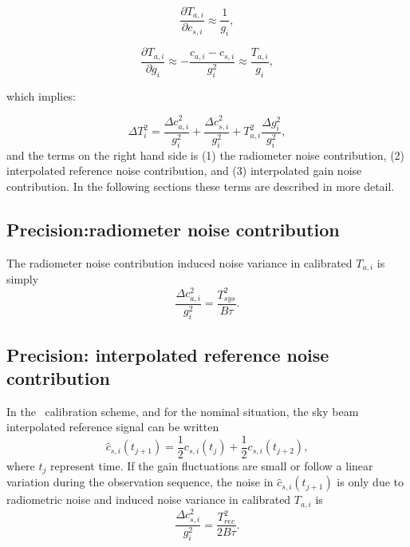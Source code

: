 \begin{equation}
\frac{\partial T_{a,i}}{\partial c_{s,i}} \approx \frac{1}{g_i}, 
\end{equation}

\begin{equation}
\frac{\partial T_{a,i}}{\partial g_{i}} \approx -\frac{c_{a,i}-c_{s,i}}{g_{i}^{2}} \approx \frac{T_{a,i}}{g_i}, 
\end{equation}

which implies:

\begin{equation}
\Delta T_{i}^{2} = \frac{\Delta c_{a,i}^{2}}{g_{i}^2} + \frac{\Delta c_{s,i}^{2}}{g_{i}^2} + T_{a,i}^{2}\frac{\Delta g_{i}^{2}}{g_{i}^2},
\end{equation}
and the terms on the right hand side is (1) the radiometer noise contribution,
(2) interpolated reference noise contribution, and (3) interpolated gain noise contribution.  
In the following sections these terms are described in more detail.

\subsection*{Precision:radiometer noise contribution}
The radiometer noise contribution induced noise variance in calibrated \(T_{a,i}\) is simply
\begin{equation}
\frac{\Delta c_{a,i}^{2}}{g_{i}^2} = \frac{T_{sys}^{2}}{B\tau}.
\end{equation}



\subsection*{Precision: interpolated reference noise contribution}
In the \smr\ calibration scheme, and for the nominal situation, the sky beam interpolated
reference signal can be written
\begin{equation}
\hat{c}_{s,i}(t_{j+1}) = \frac{1}{2}c_{s,i}(t_{j}) + \frac{1}{2}c_{s,i}(t_{j+2}), 
\end{equation}
where \(t_{j}\) represent time.  
If the gain fluctuations are small or follow a linear variation during the
observation sequence, the noise in \(\hat{c}_{s,i}(t_{j+1})\) is only due to radiometric
noise and induced noise variance in calibrated \(T_{a,i}\) is
\begin{equation}
\frac{\Delta c_{s,i}^{2}}{g_{i}^2} = \frac{T_{rec}^{2}}{2B\tau}.
\end{equation}

